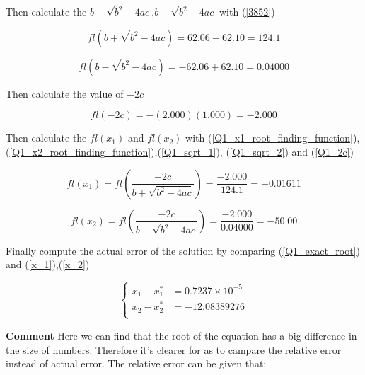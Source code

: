 \begin{solution}
Then calculate the $b+\sqrt{b^2-4ac}$,$b-\sqrt{b^2-4ac}$ with (\ref{3852})

\begin{equation}
	f l\left(b+\sqrt{b^{2}-4 a c}\right)=62.06+62.10=124.1 \label{Q1_sqrt_1}
\end{equation}

\begin{equation}
f l\left(b-\sqrt{b^{2}-4 a c}\right)=-62.06+62.10=0.04000 \label{Q1_sqrt_2}
\end{equation}



Then calculate the value of $-2c$

\begin{equation}
f l(-2 c)=-(2.000)(1.000)=-2.000 \label{Q1_2c}
\end{equation}

Then calculate the $fl(x_1)$ and $fl(x_2)$ with (\ref{Q1_x1_root_finding_function}), (\ref{Q1_x2_root_finding_function}),(\ref{Q1_sqrt_1}), (\ref{Q1_sqrt_2}) and (\ref{Q1_2c})



\begin{equation}
fl (x_{1})=fl\left(\frac{-2 c}{b+\sqrt{b^{2}-4 a c}}\right)=\frac{-2.000}{124.1}=-0.01611 \label{x_1}
\end{equation}

\begin{equation}
	fl\left(x_{2}\right)=f l\left(\frac{-2 c}{b-\sqrt{b^{2}-4 a c}}\right)=\frac{-2.000}{0.04000}=-50.00 \label{x_2}
\end{equation}

Finally compute the actual error of the solution by comparing (\ref{Q1_exact_root}) and (\ref{x_1}),(\ref{x_2})


\begin{equation}
\left\{
	\begin{aligned}
		x_1-x_1^*&=0.7237 \times 10^{-5}\\
		x_2-x_2^*&=-12.08389276 \label{act_error} \\                     
	\end{aligned}
\right.
\end{equation}




\textbf{Comment} Here we can find that the root of the equation has a big difference in the size of numbers. Therefore it's clearer for as to campare the relative error instead of actual error. The relative error can be given that:


\end{solution}
